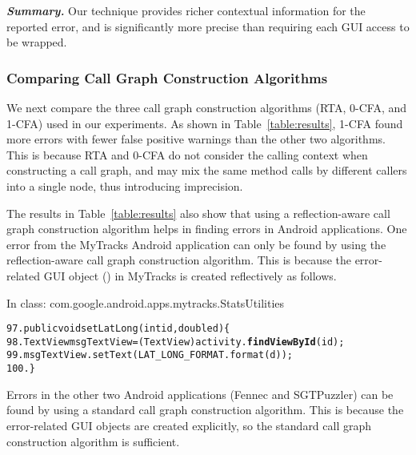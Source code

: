 \vspace{1mm}

\noindent \textbf{\textit{Summary.}} Our technique provides
richer contextual information for the reported error, and 
is significantly more precise than requiring each GUI
access to be wrapped.

\subsubsection{Comparing Call Graph Construction Algorithms}
\label{sec:reflectionaware}

We next compare the three call graph construction algorithms (RTA, 0-CFA, and 1-CFA)
used in our experiments. As shown in Table~\ref{table:results},  1-CFA found
more errors with fewer false positive warnings than the other two algorithms. This
is because RTA and 0-CFA do not consider the calling context when
constructing a call graph, and may
mix the same method calls by different callers into a single node, thus
introducing imprecision. 


The results in Table~\ref{table:results} also show that using a reflection-aware
call graph construction algorithm helps in finding errors in Android
applications. One error from the MyTracks Android application
can only be found by using the reflection-aware call graph construction algorithm.
This is because the error-related GUI object () in MyTracks is created
reflectively as follows.

{\vspace{2mm}
\hspace{3mm}\small{In class: com.google.android.apps.mytracks.StatsUtilities}
\vspace{-2mm}
\begin{CodeOut}
\begin{alltt}
97.  public void setLatLong(int id, double d) \{
98.     TextView msgTextView = (TextView) activity.\textbf{findViewById}(id);
99.     msgTextView.setText(LAT\_LONG\_FORMAT.format(d));
100. \}
\end{alltt}
\end{CodeOut}}

 
Errors in the other two Android applications (Fennec and SGTPuzzler)
can be found by using a standard call graph construction algorithm.
This is because the error-related GUI objects are created explicitly,
so the standard call graph construction algorithm is sufficient.

